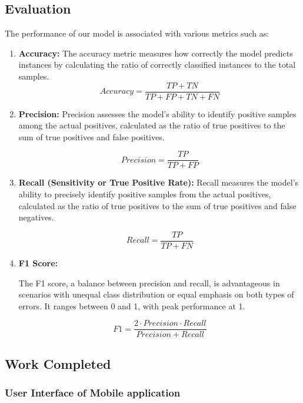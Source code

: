\subsection{Evaluation}
The performance of our model is associated with various metrics such as: 
\begin{enumerate}
    \item \textbf{Accuracy:}
           The accuracy metric measures how correctly the model predicts instances by calculating the ratio of correctly classified instances to the total samples.
           \[ Accuracy = \frac{TP + TN}{TP + FP + TN + FN} \]
    
    \item \textbf{Precision:}
           Precision assesses the model's ability to identify positive samples among the actual positives, calculated as the ratio of true positives to the sum of true positives and false positives.

           \[ Precision = \frac{TP}{TP + FP} \]
    
    \item \textbf{Recall (Sensitivity or True Positive Rate):}
           Recall measures the model's ability to precisely identify positive samples from the actual positives, calculated as the ratio of true positives to the sum of true positives and false negatives.

           \[ Recall = \frac{TP}{TP + FN} \]
       
    
    \item \textbf{F1 Score:}
       
           The F1 score, a balance between precision and recall, is advantageous in scenarios with unequal class distribution or equal emphasis on both types of errors. It ranges between 0 and 1, with peak performance at 1.

           \[ F1 = \frac{2 \cdot Precision \cdot Recall}{Precision + Recall} \]
      
    \end{enumerate}
    
\subsection{Work Completed}
\subsubsection{User Interface of Mobile application}
